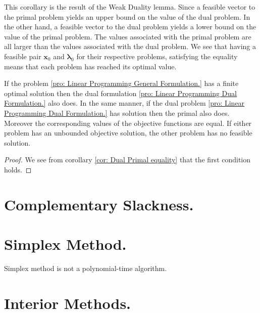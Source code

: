 This corollary is the result of the Weak Duality lemma. Since a feasible vector to the primal problem yields an upper bound on the value of the dual problem. In the other hand, a feasible vector to the dual problem yields a lower bound on the value of the primal problem. The values associated with the primal problem are all larger than the values associated with the dual problem. We see that having a feasible pair $\mathbf{x}_0$ and $\pmb{\lambda}_0$ for their respective problems, satisfying the equality means that each problem has reached its optimal value. 

\begin{theorem}
	If the problem \eqref{pro: Linear Programming General Formulation.} has a finite optimal solution then the dual formulation \eqref{pro: Linear Programming Dual Formulation.} also does. In the same manner, if the dual problem \eqref{pro: Linear Programming Dual Formulation.} has solution then the primal also does. Moreover the corresponding values of the objective functions are equal. If either problem has an unbounded objective solution, the other problem has no feasible solution.
\end{theorem}
\begin{proof}
We see from corollary \ref{cor: Dual Primal equality} that the first condition holds. 
\end{proof}

\section{Complementary Slackness.}
\section{Simplex Method.}
	Simplex method is not a polynomial-time algorithm.
\section{Interior Methods.}

